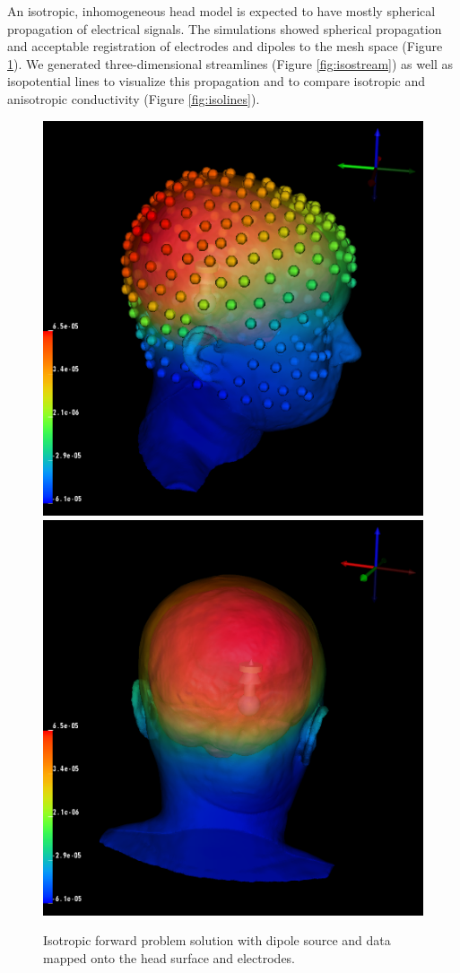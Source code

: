 An isotropic, inhomogeneous head model is expected to have mostly spherical propagation of electrical signals. The simulations showed spherical propagation and acceptable registration of electrodes and dipoles to the mesh space (Figure \ref{fig:isodip}). We generated three-dimensional streamlines (Figure \ref{fig:isostream}) as well as isopotential lines to visualize this propagation and to compare isotropic and anisotropic conductivity (Figure \ref{fig:isolines}). 

\begin{figure}[H]
\begin{center}
\includegraphics[width=.49\textwidth]{Figures/iso_dipole}
\includegraphics[width=.49\textwidth]{Figures/iso_dipole_2}
\caption{Isotropic forward problem solution with dipole source and data mapped onto the head surface and electrodes.}
\label{fig:isodip}
\end{center}
\end{figure}

